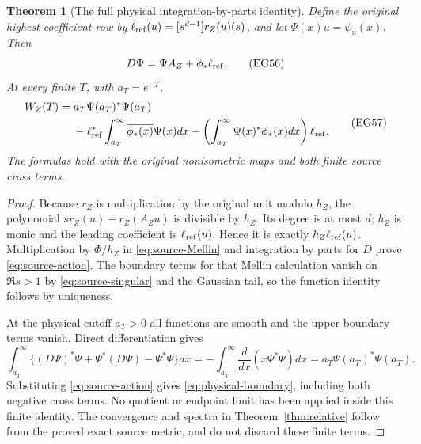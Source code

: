 \documentclass[11pt]{article}
\newtheorem{theorem}{Theorem}[section]
\begin{document}
\begin{theorem}[The full physical integration-by-parts identity]
\label{thm:physical-boundary}
Define the original highest-coefficient row by
$\ell_{\rm ref}(u)=[s^{d-1}]r_Z(u)(s)$, and let
$\Psi(x)u=\psi_u(x)$. Then
\[
 D\Psi=\Psi A_Z+\phi_*\ell_{\rm ref}.
 \tag{EG56}\label{eq:source-action}
\]
At every finite $T$, with $a_T=e^{-T}$,
\[
 \begin{split}
 W_Z(T)={}&a_T\Psi(a_T)^*\Psi(a_T)\\
 &-\ell_{\rm ref}^*\int_{a_T}^\infty\overline{\phi_*(x)}\Psi(x)dx
 -\left(\int_{a_T}^\infty\Psi(x)^*\phi_*(x)dx\right)\ell_{\rm ref}.
 \end{split}\tag{EG57}\label{eq:physical-boundary}
\]
The formulas hold with the original nonisometric maps and both
finite source cross terms.
\end{theorem}
\begin{proof}
Because $r_Z$ is multiplication by the original unit modulo $h_Z$,
the polynomial $s r_Z(u)-r_Z(A_Zu)$ is divisible by $h_Z$.
Its degree is at most $d$; $h_Z$ is monic and the leading coefficient
is $\ell_{\rm ref}(u)$. Hence it is exactly
$h_Z\ell_{\rm ref}(u)$. Multiplication by $\Phi/h_Z$ in
\eqref{eq:source-Mellin} and integration by parts for $D$ prove
\eqref{eq:source-action}. The boundary terms for that Mellin
calculation vanish on $\Re s>1$ by \eqref{eq:source-singular} and
the Gaussian tail, so the function identity follows by uniqueness.

At the physical cutoff $a_T>0$ all functions are smooth and the
upper boundary terms vanish. Direct differentiation gives
\[
 \int_{a_T}^\infty\{(D\Psi)^*\Psi+\Psi^*(D\Psi)-\Psi^*\Psi\}dx
 =-\int_{a_T}^\infty\frac{d}{dx}(x\Psi^*\Psi)dx
 =a_T\Psi(a_T)^*\Psi(a_T).
\]
Substituting \eqref{eq:source-action} gives
\eqref{eq:physical-boundary}, including both negative cross terms.
No quotient or endpoint limit has been applied inside this finite
identity. The convergence and spectra in
Theorem~\ref{thm:relative} follow from the proved exact source metric,
and do not discard these finite terms.
\end{proof}
\end{document}
